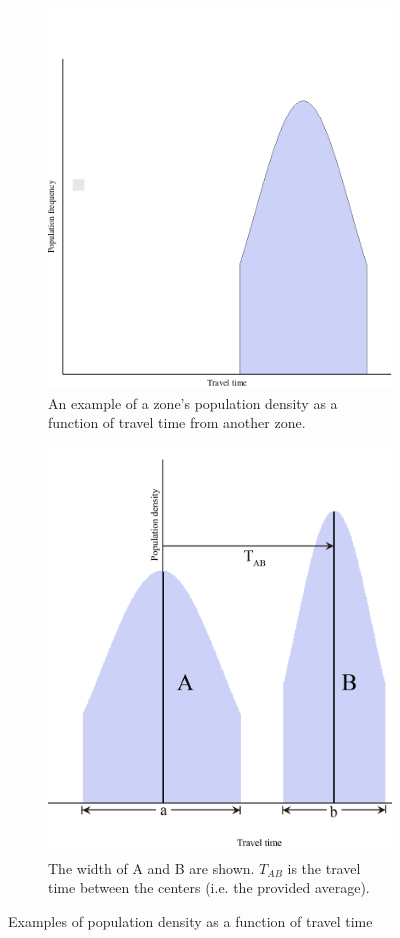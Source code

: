 \documentclass[notitlepage, 12pt]{article}
\begin{document}
\begin{figure}
\centering
\begin{subfigure}{.45\textwidth}
  \centering
  \includegraphics[width=0.9\linewidth]{B(t).png}
  \caption{An example of a zone's population density as a function of travel time from another zone.}
  \label{B(t)}
\end{subfigure}%
\hfill
\begin{subfigure}{.45\textwidth}
  \centering
  \includegraphics[width=0.9\linewidth]{A(t)B(t).png}
  \caption{The width of A and B are shown. $T_{AB} $ is the travel time between the centers (i.e. the provided average).}
  \label{A(t)B(t)}
\end{subfigure}
\caption{Examples of population density as a function of travel time}
\label{examples}
\end{figure}
\end{document}
